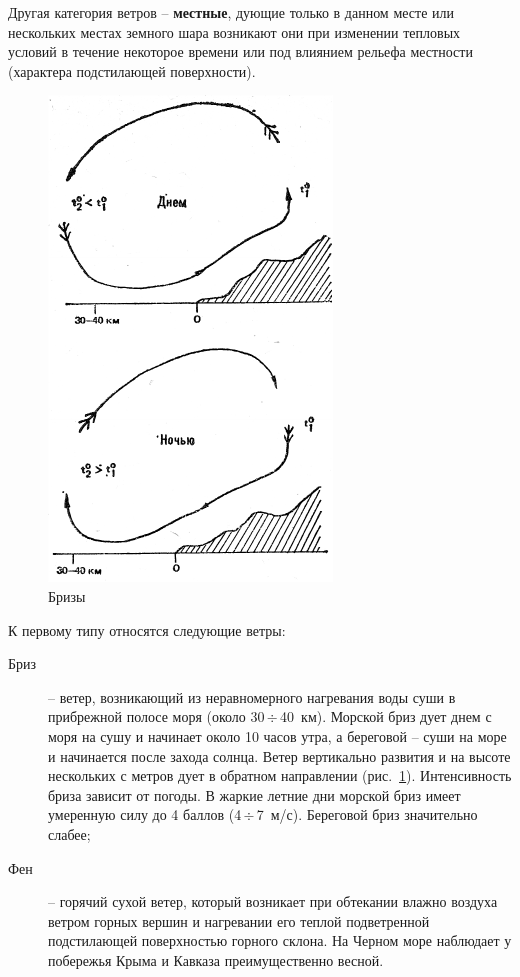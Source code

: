\documentclass[a4paper, 12pt, twoside, final, book, russian, fittopage, cyremdash]{ncc}
\newcommand{\otdo}{\,\ensuremath{\div}\,}
\newcommand{\ris}[1]{\ref{fig:#1}}
\begin{document}
Другая категория ветров \--- \textbf{местные}, дующие только в данном месте или нескольких местах земного шара возникают они при изменении тепловых условий в течение некоторое времени или под влиянием рельефа местности (характера подстилающей поверхности).

\begin{figure}[htb]
  \centering{}
  \includegraphics[scale=1.2]{0118P}
  \caption{Бризы}
  \label{fig:118}
\end{figure}

К первому типу относятся следующие ветры:
\begin{description}
\item [Бриз] \--- ветер, возникающий из неравномерного нагревания воды суши в прибрежной полосе моря (около 30\otdo 40~км). Морской бриз дует днем с моря на сушу и начинает около 10 часов утра, а береговой \--- суши на море и начинается после захода солнца. Ветер вертикально развития и на высоте нескольких с метров дует в обратном направлении (рис.~\ris{118}). Интенсивность бриза зависит от погоды. В жаркие летние дни морской бриз имеет умеренную силу до 4 баллов (4\otdo 7~м/с). Береговой бриз значительно слабее;
\item[Фен] \--- горячий сухой ветер, который возникает при обтекании влажно воздуха ветром горных вершин и нагревании его теплой подветренной подстилающей поверхностью горного склона. На Черном море наблюдает у побережья Крыма и Кавказа преимущественно весной.
\end{description}
\end{document}
